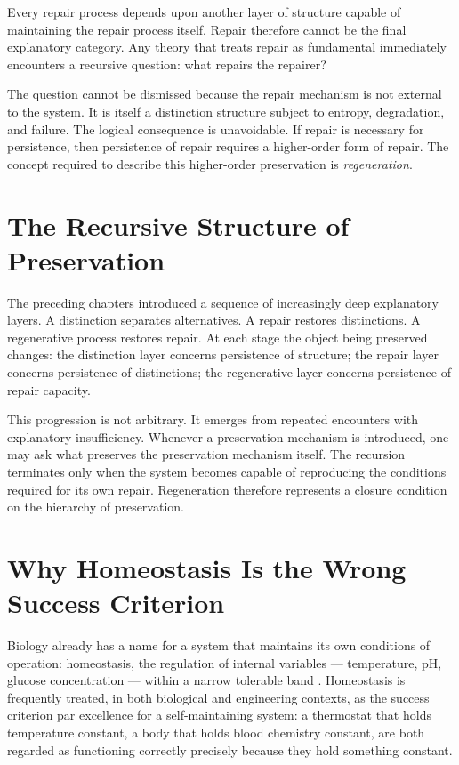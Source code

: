 \documentclass[12pt,twoside,openright]{book}
\begin{document}
Every repair process depends upon another layer of
structure capable of maintaining the repair process itself.
Repair therefore cannot be the final explanatory category.
Any theory that treats repair as fundamental immediately
encounters a recursive question: what repairs the repairer?

The question cannot be dismissed because the repair
mechanism is not external to the system. It is itself a
distinction structure subject to entropy, degradation, and
failure. The logical consequence is unavoidable. If repair
is necessary for persistence, then persistence of repair
requires a higher-order form of repair. The concept
required to describe this higher-order preservation is
\emph{regeneration}.

\section{The Recursive Structure of Preservation}
\label{sec:ch11-recursive}

The preceding chapters introduced a sequence of
increasingly deep explanatory layers. A distinction
separates alternatives. A repair restores distinctions. A
regenerative process restores repair. At each stage the
object being preserved changes: the distinction layer
concerns persistence of structure; the repair layer
concerns persistence of distinctions; the regenerative
layer concerns persistence of repair capacity.

This progression is not arbitrary. It emerges from repeated
encounters with explanatory insufficiency. Whenever a
preservation mechanism is introduced, one may ask what
preserves the preservation mechanism itself. The recursion
terminates only when the system becomes capable of
reproducing the conditions required for its own repair.
Regeneration therefore represents a closure condition on
the hierarchy of preservation.

\section{Why Homeostasis Is the Wrong Success Criterion}
\label{sec:ch11-homeostasis}

Biology already has a name for a system that maintains its
own conditions of operation: homeostasis, the regulation of
internal variables --- temperature, pH, glucose
concentration --- within a narrow tolerable band
\parencite{ashby1956}. Homeostasis is frequently treated, in
both biological and engineering contexts, as the success
criterion par excellence for a self-maintaining system: a
thermostat that holds temperature constant, a body that
holds blood chemistry constant, are both regarded as
functioning correctly precisely because they hold something
constant.
\end{document}
